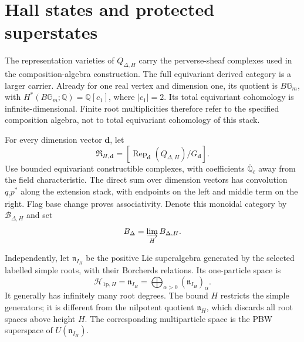 \section{Hall states and protected superstates}
The representation varieties of $Q_{\Delta,H}$ carry the
perverse-sheaf complexes used in the composition-algebra construction.
The full equivariant derived category is a larger carrier.
Already for one real vertex and dimension one, its quotient is
$B\mathbb G_m$, with $H^*(B\mathbb G_m;\mathbb Q)=\mathbb Q[c_1]$,
where $|c_1|=2$. Its total equivariant cohomology is infinite-dimensional.
Finite root multiplicities therefore refer to the specified composition
algebra, not to total equivariant cohomology of this stack.

\begin{definition}
For every dimension vector $\mathbf d$, let
\[
 \mathfrak R_{H,\mathbf d}=
 [\operatorname{Rep}_{\mathbf d}(Q_{\Delta,H})/G_{\mathbf d}].
\]
Use bounded equivariant constructible complexes, with coefficients
$\overline{\mathbb Q}_\ell$ away from the field characteristic.
The direct sum over dimension vectors has convolution $q_!p^*$
along the extension stack, with endpoints on the left and middle
term on the right. Flag base change proves associativity. Denote
this monoidal category by $\mathcal B_{\Delta,H}$ and set
\[
 \mathcal B_\Delta=\varinjlim_H\mathcal B_{\Delta,H}.
\]
\end{definition}

Independently, let \(\mathfrak n_{I_H}\) be the positive Lie
superalgebra generated by the selected labelled simple roots, with
their Borcherds relations. Its one-particle space is
\[
 \mathcal H_{\mathrm{1p},H}=\mathfrak n_{I_H}
       =\bigoplus_{\alpha>0}(\mathfrak n_{I_H})_\alpha.
\]
It generally has infinitely many root degrees. The bound \(H\)
restricts the simple generators; it is different from the nilpotent
quotient \(\mathfrak n_H\), which discards all root spaces above
height \(H\). The corresponding multiparticle space is the
PBW superspace of \(U(\mathfrak n_{I_H})\).

